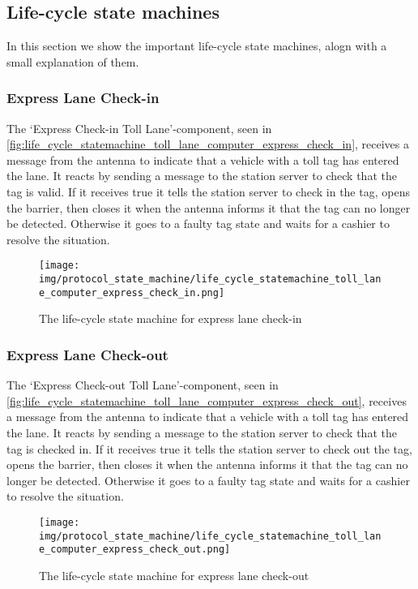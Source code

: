 \subsection*{Life-cycle state machines}
In this section we show the important life-cycle state machines, alogn with a small explanation of them.
\subsubsection*{Express Lane Check-in}
The ‘Express Check-in Toll Lane’-component, seen in \autoref{fig:life_cycle_statemachine_toll_lane_computer_express_check_in}, receives a message from the antenna to indicate that a vehicle with a toll tag has entered the lane. It reacts by sending a message to the station server to check that the tag is valid. If it receives true it tells the station server to check in the tag, opens the barrier, then closes it when the antenna informs it that the tag can no longer be detected.  Otherwise it goes to a faulty tag state and waits for a cashier to resolve the situation. 
\begin{figure}[H]
\centering
\texttt{[image: img/protocol\_state\_machine/life\_cycle\_statemachine\_toll\_lane\_computer\_express\_check\_in.png]}
\caption{The life-cycle state machine for express lane check-in}
\label{fig:life_cycle_statemachine_toll_lane_computer_express_check_in}
\end{figure}

\subsubsection*{Express Lane Check-out}
The ‘Express Check-out Toll Lane’-component, seen in \autoref{fig:life_cycle_statemachine_toll_lane_computer_express_check_out}, receives a message from the antenna to indicate that a vehicle with a toll tag has entered the lane. It reacts by sending a message to the station server to check that the tag is checked in. If it receives true it tells the station server to check out the tag, opens the barrier, then closes it when the antenna informs it that the tag can no longer be detected.  Otherwise it goes to a faulty tag state and waits for a cashier to resolve the situation. 
\begin{figure}[H]
\centering
\texttt{[image: img/protocol\_state\_machine/life\_cycle\_statemachine\_toll\_lane\_computer\_express\_check\_out.png]}
\caption{The life-cycle state machine for express lane check-out}
\label{fig:life_cycle_statemachine_toll_lane_computer_express_check_out}
\end{figure}

